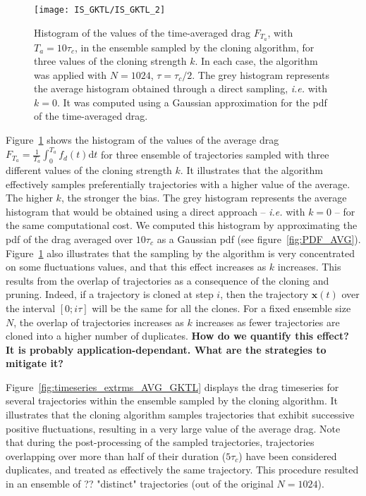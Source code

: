 \begin{figure}
  \centering
  \texttt{[image: IS\_GKTL/IS\_GKTL\_2]}
  \caption{Histogram of the values of the time-averaged drag $F_{T_a}$, with $T_a = 10\tau_c$, in the ensemble sampled by the cloning algorithm, for three values of the cloning strength $k$. In each case, the algorithm was applied with $N=1024$, $\tau = \tau_c / 2$. The grey histogram represents the average histogram obtained through a direct sampling, \textit{i.e.} with $k=0$. It was computed using a Gaussian approximation for the \ac{pdf} of the time-averaged drag.}
  \label{fig:IS_GKTL}
\end{figure}
Figure~\ref{fig:IS_GKTL} shows the histogram of the values of the average drag $F_{T_a} = \frac{1}{T_a}\int_{0}^{T_a}f_d(t)\mathrm{d}t$ for three ensemble of trajectories sampled with three different values of the cloning strength $k$.
It illustrates that the algorithm effectively samples preferentially trajectories with a higher value of the average.
The higher $k$, the stronger the bias.
The grey histogram represents the average histogram that would be obtained using a direct approach -- \textit{i.e.} with $k=0$ -- for the same computational cost.
We computed this histogram by approximating the \ac{pdf} of the drag averaged over $10\tau_c$ as a Gaussian \ac{pdf} (see figure~\ref{fig:PDF_AVG}).
Figure~\ref{fig:IS_GKTL} also illustrates that the sampling by the algorithm is very concentrated on some fluctuations values, and that this effect increases as $k$ increases.
This results from the overlap of trajectories as a consequence of the cloning and pruning.
Indeed, if a trajectory is cloned at step $i$, then the trajectory ${\mathbf{x}(t)}$ over the interval $[0;i\tau]$ will be the same for all the clones.
For a fixed ensemble size $N$, the overlap of trajectories increases as $k$ increases as fewer
trajectories are cloned into a higher number of duplicates.
\textbf{How do we quantify this effect? It is probably application-dependant. What are the strategies to mitigate it?}

Figure~\ref{fig:timeseries_extrms_AVG_GKTL} displays the drag timeseries for several trajectories within the ensemble sampled by the cloning algorithm.
It illustrates that the cloning algorithm samples trajectories that exhibit successive positive fluctuations, resulting in a very large value of the average drag.
Note that during the post-processing of the sampled trajectories, trajectories overlapping over more than half of their duration ($5 \tau_c$) have been considered duplicates, and treated as effectively the same trajectory.
This procedure resulted in an ensemble of ?? "distinct" trajectories (out of the original $N = 1024$).

